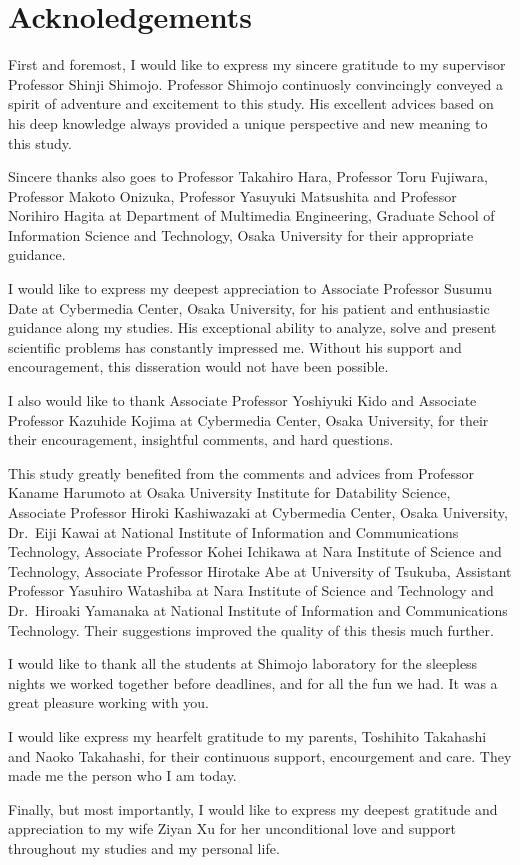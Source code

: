 \chapter*{Acknoledgements}

First and foremost, I would like to express my sincere gratitude to my
supervisor Professor Shinji Shimojo. Professor Shimojo continuosly
convincingly conveyed a spirit of adventure and excitement to this study. His
excellent advices based on his deep knowledge always provided a unique
perspective and new meaning to this study.

Sincere thanks also goes to Professor Takahiro Hara, Professor Toru Fujiwara,
Professor Makoto Onizuka, Professor Yasuyuki Matsushita and Professor Norihiro
Hagita at Department of Multimedia Engineering, Graduate School of Information
Science and Technology, Osaka University for their appropriate guidance.

I would like to express my deepest appreciation to Associate Professor Susumu
Date at Cybermedia Center, Osaka University, for his patient and enthusiastic
guidance along my studies. His exceptional ability to analyze, solve and
present scientific problems has constantly impressed me. Without his support
and encouragement, this disseration would not have been possible.

I also would like to thank Associate Professor Yoshiyuki Kido and Associate
Professor Kazuhide Kojima at Cybermedia Center, Osaka University, for their
their encouragement, insightful comments, and hard questions.

This study greatly benefited from the comments and advices from Professor
Kaname Harumoto at Osaka University Institute for Datability Science,
Associate Professor Hiroki Kashiwazaki at Cybermedia Center, Osaka University,
Dr.~Eiji Kawai at National Institute of Information and Communications
Technology, Associate Professor Kohei Ichikawa at Nara Institute of Science
and Technology, Associate Professor Hirotake Abe at University of Tsukuba,
Assistant Professor Yasuhiro Watashiba at Nara Institute of Science and
Technology and Dr.~Hiroaki Yamanaka at National Institute of Information and
Communications Technology. Their suggestions improved the quality of this
thesis much further.

I would like to thank all the students at Shimojo laboratory for the sleepless
nights we worked together before deadlines, and for all the fun we had. It was
a great pleasure working with you.

I would like express my hearfelt gratitude to my parents, Toshihito Takahashi
and Naoko Takahashi, for their continuous support, encourgement and care. They
made me the person who I am today.

Finally, but most importantly, I would like to express my deepest gratitude
and appreciation to my wife Ziyan Xu for her unconditional love and support
throughout my studies and my personal life.
